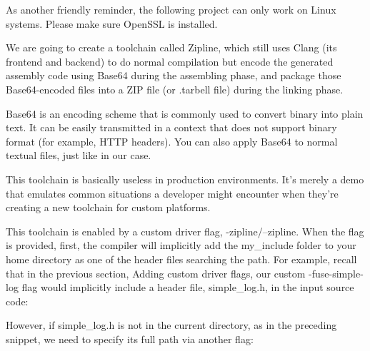 \begin{tcolorbox}[colback=blue!5!white,colframe=blue!75!black, fonttitle=\bfseries,title=System requirements]	
\hspace*{0.7cm}As another friendly reminder, the following project can only work on Linux systems. Please make sure OpenSSL is installed.
\end{tcolorbox}


We are going to create a toolchain called Zipline, which still uses Clang (its frontend and backend) to do normal compilation but encode the generated assembly code using Base64 during the assembling phase, and package those Base64-encoded files into a ZIP file (or .tarbell file) during the linking phase.

\begin{tcolorbox}[colback=blue!5!white,colframe=blue!75!black, fonttitle=\bfseries,title=Base64]	
\hspace*{0.7cm}Base64 is an encoding scheme that is commonly used to convert binary into plain text. It can be easily transmitted in a context that does not support binary format (for example, HTTP headers). You can also apply Base64 to normal textual files, just like in our case.
\end{tcolorbox}

This toolchain is basically useless in production environments. It's merely a demo that emulates common situations a developer might encounter when they're creating a new toolchain for custom platforms.

This toolchain is enabled by a custom driver flag, -zipline/--zipline. When the flag is provided, first, the compiler will implicitly add the my\_include folder to your home directory as one of the header files searching the path. For example, recall that in the previous section, Adding custom driver flags, our custom -fuse-simple-log flag would implicitly include a header file, simple\_log.h, in the input source code:


However, if simple\_log.h is not in the current directory, as in the preceding snippet, we need to specify its full path via another flag:

